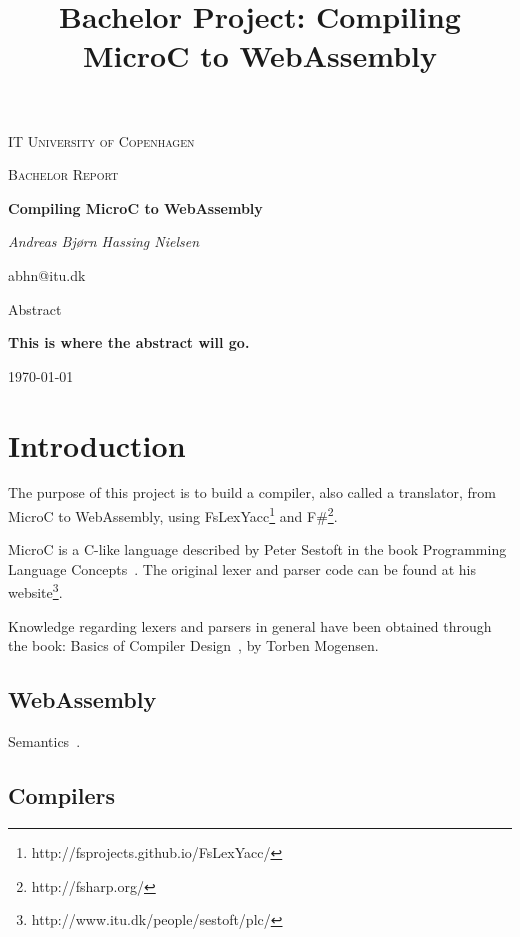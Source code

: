 \documentclass[a4paper]{article}
\title{Bachelor Project: Compiling MicroC to WebAssembly}
\begin{document}
\begin{titlepage}
	\centering
	{\scshape\LARGE IT University of Copenhagen \par}
	\vspace{1cm}
	{\scshape\Large Bachelor Report\par}
	\vspace{1.5cm}
	{\huge\bfseries Compiling MicroC to WebAssembly \par}
	\vspace{2cm}
	{\Large\itshape Andreas Bjørn Hassing Nielsen\par}
	abhn@itu.dk\\
	\vspace{2cm}
	{\Large Abstract\par}
	{\bfseries This is where the abstract will go.}
	\vfill
	{\large \today\par}
\end{titlepage}

\newpage

\tableofcontents
\newpage


\section{Introduction}
The purpose of this project is to build a compiler, also called a translator, from MicroC to WebAssembly, using FsLexYacc\footnote{http://fsprojects.github.io/FsLexYacc/} and F\#\footnote{http://fsharp.org/}.

MicroC is a C-like language described by Peter Sestoft in the book Programming Language Concepts~\cite{PLC}. The original lexer and parser code can be found at his website\footnote{http://www.itu.dk/people/sestoft/plc/}.

Knowledge regarding lexers and parsers in general have been obtained through the book: Basics of Compiler Design~\cite{BCD}, by Torben Mogensen.

\subsection{WebAssembly}
Semantics~\cite{website:wasm-semantics}.

\subsection{Compilers}
\end{document}
